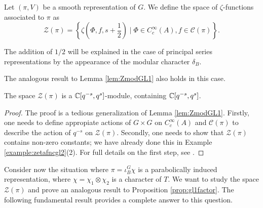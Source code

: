 \iffalse
\textbf{This would be a good point to introduce a few examples. Ideas:
\begin{enumerate}
    \item Explicit computation of some zeta functions associated to the character $\det$ or $\phi\circ\det$. This requires, however, the cartan decomposition, which is not here yet.
    \item Explicit computation that $\mathcal{Z}(\pi)$ contains a non-zero constant. This would be an explicit step of the proof of Lemma \ref{lem:ZmodGL2}. If we do this, should we just prove the lemma as a whole?
\end{enumerate}
}
\fi

\begin{defn}
    Let $(\pi,V)$ be a smooth representation of $G$. We define the space of $\zeta$-functions associated to $\pi$ as $$\mathcal Z(\pi) = \left\{\zeta\left(\Phi,f,s+\frac{1}{2}\right) \mid \Phi \in C_c^\infty(A), f \in \mathcal C(\pi)\right\}.$$
\end{defn}
\begin{rem}
    The addition of $1/2$ will be explained in the case of principal series representations by the appearance of the modular character $\delta_B$.
\end{rem}

The analogous result to Lemma \ref{lem:ZmodGL1} also holds in this case.

\begin{lemma}\label{lem:ZmodGL2}
    The space $\mathcal Z(\pi)$ is a $\mathbb{C}[q^{-s},q^s]$-module, containing $\mathbb{C}[q^{-s},q^s]$.
\end{lemma}
\begin{proof}
    The proof is a tedious generalization of Lemma \ref{lem:ZmodGL1}. Firstly, one needs to define appropiate actions of $G\times G$ on $C_c^\infty(A)$ and $\mathcal{C}(\pi)$ to describe the action of $q^{-s}$ on $\mathcal{Z}(\pi)$. Secondly, one needs to show that $\mathcal{Z}(\pi)$ contains non-zero constants; we have already done this in Example \ref{example:zetafncgl2}(2). For full details on the first step, see
    \cite[Lemma 24.4.2]{BH1}.
\end{proof}


Consider now the situation where $\pi = \iota_B^G \chi$ is a parabolically induced representation, where $\chi = \chi_1 \otimes \chi_2$ is a character of $T$. We want to study the space $\mathcal Z(\pi)$ and prove an analogous result to Proposition \ref{prop:gl1factor}. The following fundamental result provides a complete answer to this question.


